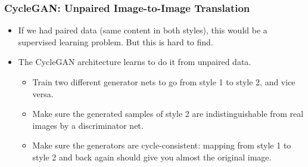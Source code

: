 \begin{frame}
    \frametitle{CycleGAN: Unpaired Image-to-Image Translation}
    \begin{itemize}
        \item If we had paired data (same content in both styles), this would be a supervised learning problem. But this is hard to find.
        \item The CycleGAN architecture learns to do it from unpaired data.
              \begin{itemize}
                  \item Train two different generator nets to go from style 1 to style 2, and vice versa.
                  \item Make sure the generated samples of style 2 are indistinguishable from real images by a discriminator net.
                  \item Make sure the generators are cycle-consistent: mapping from style 1 to style 2 and back again should give you almost the original image.
              \end{itemize}
    \end{itemize}
\end{frame}



